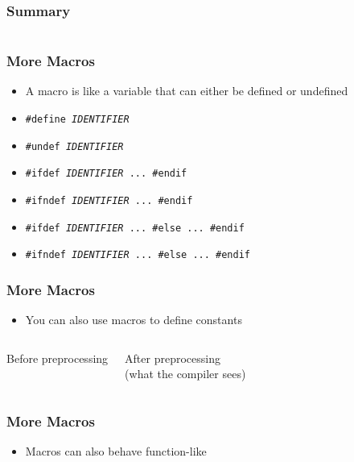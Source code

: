 \begin{frame}
  \frametitle{Summary}
  \begin{columns}
    \column{6cm}
    \column{6cm}
  \end{columns}
\end{frame}

\begin{frame}
  \frametitle{More Macros}
  \begin{itemize}
    \item A macro is like a variable
          that can either be defined or undefined
    \item {\tt \#define {\it IDENTIFIER}}
    \item {\tt \#undef {\it IDENTIFIER}}
    \item {\tt \#ifdef {\it IDENTIFIER} ... \#endif}
    \item {\tt \#ifndef {\it IDENTIFIER} ... \#endif}
    \item {\tt \#ifdef {\it IDENTIFIER} ... \#else ... \#endif}
    \item {\tt \#ifndef {\it IDENTIFIER} ... \#else ... \#endif}
  \end{itemize}
\end{frame}

\begin{frame}
  \frametitle{More Macros}
  \begin{itemize}
    \item You can also use macros to define constants
  \end{itemize}
  \begin{columns}[t]
    \column{5cm}
    \begin{center} Before preprocessing \end{center}
    \column{5cm}
    \begin{center} After preprocessing \\ (what the compiler sees) \end{center}
  \end{columns}
\end{frame}

\begin{frame}
  \frametitle{More Macros}
  \begin{itemize}
    \item Macros can also behave function-like
  \end{itemize}
  \begin{overprint}
  \end{overprint}
\end{frame}

